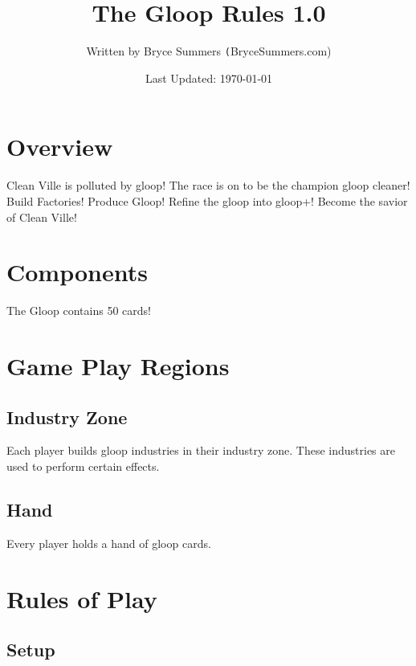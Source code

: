 \documentclass[12pt, letterpaper]{article}
\begin{document}
\title{\color{blue}The Gloop Rules 1.0}
\author{Written by Bryce Summers \texttt(BryceSummers.com)}
\date{\color{red}Last Updated: \today}
\maketitle

\tableofcontents 

\section{Overview}

Clean Ville is polluted by gloop! The race is on to be the champion gloop cleaner! Build Factories! Produce Gloop! Refine the gloop into gloop+! Become the savior of Clean Ville!

\newpage
\section{Components}

The Gloop contains 50 cards!

\section{Game Play Regions}

\subsection{Industry Zone}

Each player builds gloop industries in their industry zone. These industries are used to perform certain effects.

\subsection{Hand}

Every player holds a hand of gloop cards.

\newpage

\section{Rules of Play}

\subsection{Setup}
\end{document}
